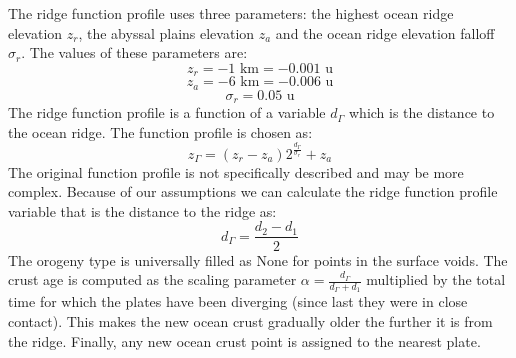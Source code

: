 The ridge function profile uses three parameters: the highest ocean ridge elevation $z_r$, the abyssal plains elevation $z_a$ and the ocean ridge elevation falloff $\sigma_r$. The values of these parameters are:
$$z_r=-1\mbox{ km}=-0.001\mbox{ u}$$
$$z_a=-6\mbox{ km}=-0.006\mbox{ u}$$
$$\sigma_r=0.05\mbox{ u}$$
The ridge function profile is a function of a variable $d_\Gamma$ which is the distance to the ocean ridge. The function profile is chosen as:
$$z_\Gamma=(z_r-z_a)2^{\frac{d_\Gamma}{\sigma_r}}+z_a$$
The original function profile is not specifically described and may be more complex.
Because of our assumptions we can calculate the ridge function profile variable that is the distance to the ridge as:
$$d_\Gamma=\frac{d_2-d_1}{2}$$
The orogeny type is universally filled as None for points in the surface voids. The crust age is computed as the scaling parameter $\alpha=\frac{d_\Gamma}{d_\Gamma+d_1}$ multiplied by the total time for which the plates have been diverging (since last they were in close contact). This makes the new ocean crust gradually older the further it is from the ridge. Finally, any new ocean crust point is assigned to the nearest plate.


